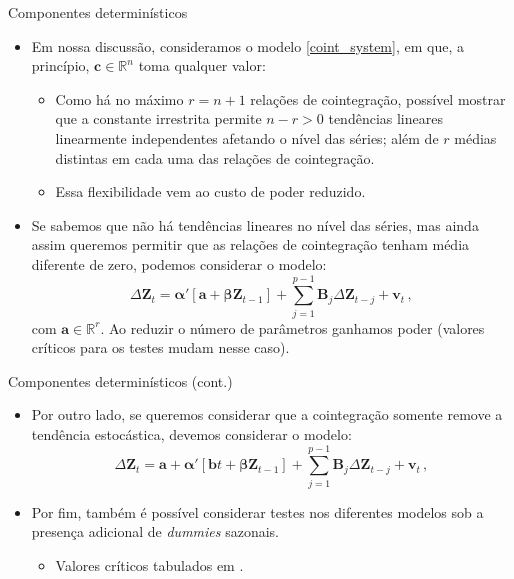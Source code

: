 \documentclass[11pt]{beamer}
\begin{document}
\begin{frame}{Componentes determinísticos}
\begin{itemize}
	\item Em nossa discussão, consideramos o modelo \eqref{coint_system}, em que, a princípio, $\boldsymbol{c} \in \mathbb{R}^n$ toma qualquer valor:
	\begin{itemize}
		\item Como há no máximo $r = n+1$ relações de cointegração, possível mostrar que a constante irrestrita permite $n - r> 0$ tendências lineares linearmente independentes  afetando o nível das séries; além de $r$ médias distintas em cada uma das relações de cointegração.
		\item Essa flexibilidade vem ao custo de poder reduzido.
	\end{itemize} 
	\item Se sabemos que não há tendências lineares no nível das séries, mas ainda assim queremos permitir que as relações de cointegração tenham média diferente de zero, podemos considerar o modelo: 
			\begin{equation*}
		\Delta \boldsymbol{Z}_t  = \boldsymbol{\alpha}'[\boldsymbol{a} + \boldsymbol{\beta} \boldsymbol{Z}_{t-1} ]+ \sum_{j=1}^{p-1} \boldsymbol{B}_{j} \Delta  \boldsymbol{Z}_{t-j} + \boldsymbol{v}_t \, , 
	\end{equation*}
	com $\boldsymbol{a} \in \mathbb{R}^{r}$. Ao reduzir o número de parâmetros ganhamos poder (valores críticos para os testes mudam nesse caso).
\end{itemize}
\end{frame}

\begin{frame}{Componentes determinísticos (cont.)}
	\begin{itemize}
	\item Por outro lado, se queremos considerar que a cointegração somente remove a tendência estocástica, devemos considerar o modelo:
\begin{equation*}
	\Delta \boldsymbol{Z}_t  =\boldsymbol{a}+ \boldsymbol{\alpha}'[\boldsymbol{b}t + \boldsymbol{\beta} \boldsymbol{Z}_{t-1} ]+ \sum_{j=1}^{p-1} \boldsymbol{B}_{j} \Delta  \boldsymbol{Z}_{t-j} + \boldsymbol{v}_t \, , 
\end{equation*}
\item Por fim, também é possível considerar testes nos diferentes modelos sob a presença adicional de \textit{dummies} sazonais.
	\begin{itemize}
	\item Valores críticos tabulados em \citet{Johansen1995}.
\end{itemize}
	\end{itemize}

\end{frame}
\end{document}
